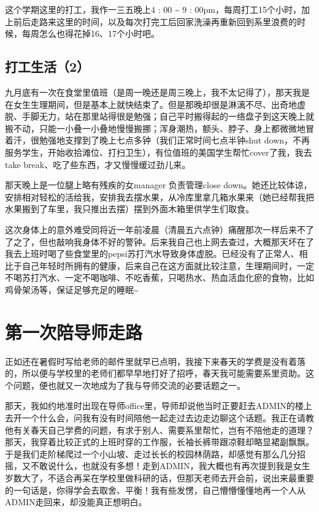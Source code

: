 \documentclass[12pt]{book}
\begin{document}
这个学期这里的打工，我作一三五晚上4 : 00 \textasciitilde{} 9 : 00pm，每周打工15个小时，加上前后走路来这里的时间，以及每次打完工后回家洗澡再重新回到系里浪费的时候，每周怎么也得花掉16、17个小时吧。

\section{打工生活（2）}
\label{sec-17-2}

九月底有一次在食堂里值班（是周一晚还是周三晚上，我不太记得了），那天我是在女生生理期间，但是基本上就快结束了。但是那晚却很是淋漓不尽、出奇地虚脱、手脚无力，站在那里站得很是勉强；自己平时搬得起的一络盘子到这天晚上就搬不动，只能一小叠一小叠地慢慢搬挪；浑身潮热，额头、脖子、身上都微微地冒着汗，很勉强地支撑到了晚上七点多钟（我们正常时间七点半钟shut down，不再服务学生，开始收拾滩位、打扫卫生），有位值班的美国学生帮忙cover了我，我去take break、吃了些东西，才又慢慢缓过劲儿来。

那天晚上是一位腿上略有残疾的女manager 负责管理close down。她还比较体谅，安排相对轻松的活给我，安排我去摆水果，从冷库里拿几箱水果来（她已经帮我把水果搬到了车里，我只推出去摆）摆到外面木箱里供学生们取食。

这次身体上的意外难受同将近一年前凌晨（清晨五六点钟）痛醒那次一样后来不了了之了，但也敲响我身体不好的警钟。后来我自己也上网去查过，大概那天坏在了我去上班时喝了些食堂里的pepsi苏打汽水导致身体虚脱。已经没有了正常人、相比于自己年轻时所拥有的健康，后来自己在这方面就比较注意，生理期间时，一定不喝苏打汽水、一定不喝咖啡、不吃香蕉，只喝热水、热血活血化瘀的食物，比如鸡骨架汤等，保证足够充足的睡眠\textasciitilde{}~

\chapter{第一次陪导师走路}
\label{sec-18}

正如还在暑假时写给老师的邮件里就早已点明，我接下来春天的学费是没有着落的，所以便与学校里的老师们都早早地打好了招呼，春天我可能需要系里资助。这个问题，便也就又一次地成为了我与导师交流的必要话题之一。

那天，我如约地准时出现在导师office里，导师却说他当时正要赶去ADMIN的楼上去开一个什么会，问我有没有时间陪他一起走过去边走边聊这个话题。我正在请教他有关春天自己学费的问题，有求于别人、需要系里帮忙，岂有不陪他走的道理？那天，我穿着比较正式的上班时穿的工作服，长袖长裤带跟凉鞋却略显裙副飘飘。于是我们走阶梯爬过一个小山坡、走过长长的校园林荫路，却感觉有那么几分招摇，又不敢说什么，也就没有多想！走到ADMIN，我大概也有再次提到我是女生岁数大了，不适合再呆在学校里做科研的话，但那天老师去开会前，说出来最重要的一句话是，你得学会去取舍、平衡！我有些发愣，自己懵懵懂懂地再一个人从ADMIN走回来，却没能真正想明白。
\end{document}
